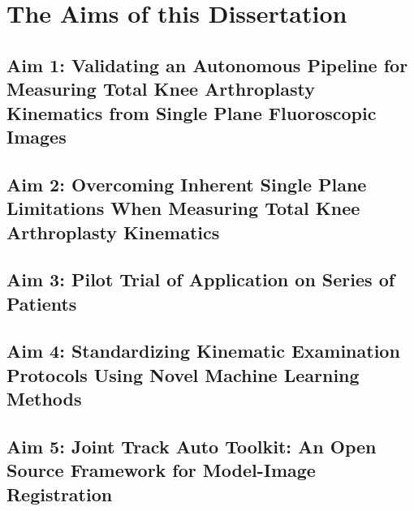 \chapter{The Aims of this Dissertation}
\label{sec:aims}

\section{Aim 1: Validating an Autonomous Pipeline for Measuring Total Knee Arthroplasty Kinematics from Single Plane Fluoroscopic Images}
\label{sec:aim1}


\section{Aim 2: Overcoming Inherent Single Plane Limitations When Measuring Total Knee Arthroplasty Kinematics}
\label{sec:aim2}


\section{Aim 3: Pilot Trial of Application on Series of Patients}
\label{sec:aim3}


\section{Aim 4: Standardizing Kinematic Examination Protocols Using Novel Machine Learning Methods}
\label{sec:aim4}


\section{Aim 5: Joint Track Auto Toolkit: An Open Source Framework for Model-Image Registration}
\label{sec:aim5}




